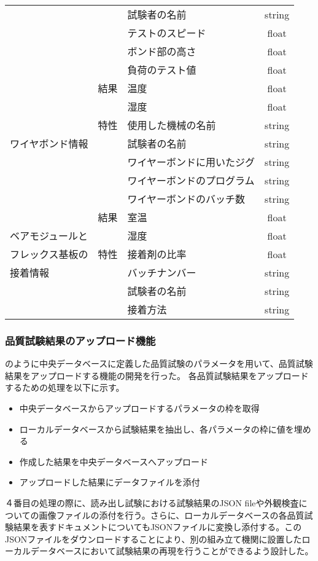 \begin{table}[tbp]
\begin{center}
\begin{tabular}{|l||c|l|c|}
      &  & 試験者の名前 & string \\
      &  & テストのスピード & float \\
      &  & ボンド部の高さ & float \\
      &  & 負荷のテスト値 & float \\
    \hline
      \multirow{7}{*}{ワイヤボンド情報}
      & 結果 & 温度 & float \\
      &  & 湿度 & float \\
    \cline{2-4}
      & 特性 & 使用した機械の名前 & string \\
      &  & 試験者の名前 & string \\
      &  & ワイヤーボンドに用いたジグ & string \\
      &  & ワイヤーボンドのプログラム & string \\
      &  & ワイヤーボンドのバッチ数 & string \\
    \hline
      & 結果 & 室温 & float \\
      ベアモジュールと &  & 湿度 & float \\
    \cline{2-4}
      フレックス基板の& 特性 & 接着剤の比率 & float \\
      接着情報&  & バッチナンバー & string \\
      &  & 試験者の名前 & string \\
      &  & 接着方法 & string \\
    \hline
    \end{tabular}
  \end{center}
\end{table}


\subsubsection{品質試験結果のアップロード機能}

のように中央データベースに定義した品質試験のパラメータを用いて、品質試験結果をアップロードする機能の開発を行った。
各品質試験結果をアップロードするための処理を以下に示す。
\begin{itemize}
  \item[1. ] 中央データベースからアップロードするパラメータの枠を取得
  \item[2. ] ローカルデータベースから試験結果を抽出し、各パラメータの枠に値を埋める
  \item[3. ] 作成した結果を中央データベースへアップロード
  \item[4. ] アップロードした結果にデータファイルを添付
\end{itemize}
４番目の処理の際に、読み出し試験における試験結果のJSON fileや外観検査についての画像ファイルの添付を行う。さらに、ローカルデータベースの各品質試験結果を表すドキュメントについてもJSONファイルに変換し添付する。このJSONファイルをダウンロードすることにより、別の組み立て機関に設置したローカルデータベースにおいて試験結果の再現を行うことができるよう設計した。

